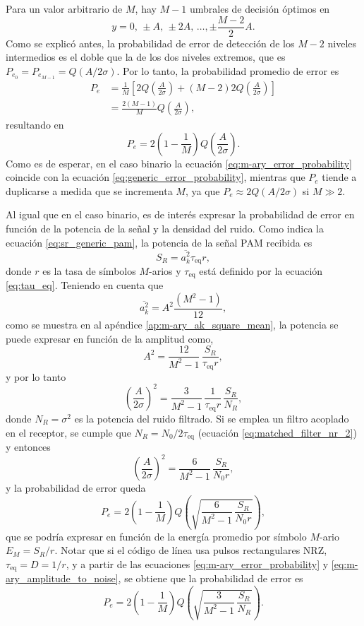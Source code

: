 \documentclass[a4paper]{article}
\begin{document}
Para un valor arbitrario de \(M\), hay \(M-1\) umbrales de decisión óptimos en 
\[
 y = 0,\,\pm A,\,\pm2A,\,\dots,\pm\frac{M-2}{2}A.
\]
Como se explicó antes, la probabilidad de error de detección de los \(M-2\) niveles intermedios es el doble que la de los dos niveles extremos, que es \(P_{e_0}=P_{e_{M-1}}=Q\left(A/2\sigma\right)\). Por lo tanto, la probabilidad promedio de error es
\begin{align*}
  P_e &= \frac{1}{M}\left[2Q\left(\frac{A}{2\sigma}\right)+(M-2)2Q\left(\frac{A}{2\sigma}\right)\right]\\
      &=\frac{2(M-1)}{M}Q\left(\frac{A}{2\sigma}\right),
\end{align*}
resultando en
\begin{equation}\label{eq:m-ary_error_probability}
  P_e=2\left(1-\frac{1}{M}\right)Q\left(\frac{A}{2\sigma}\right).
\end{equation}
Como es de esperar, en el caso binario la ecuación \ref{eq:m-ary_error_probability} coincide con la ecuación \ref{eq:generic_error_probability}, mientras que \(P_e\) tiende a duplicarse a medida que se incrementa \(M\), ya que \(P_e\approx 2Q\left(A/2\sigma\right)\) si \(M\gg 2\).

Al igual que en el caso binario, es de interés expresar la probabilidad de error en función de la potencia de la señal y la densidad del ruido. Como indica la ecuación \ref{eq:sr_generic_pam}, la potencia de la señal PAM recibida es
\[
 S_R=\overline{a_k^2}\tau_\textrm{eq}r,
\]
donde \(r\) es la tasa de símbolos \(M\)-arios y \(\tau_\textrm{eq}\) está definido por la ecuación \ref{eq:tau_eq}. Teniendo en cuenta que
\[
 \overline{a_k^2}=A^2\frac{(M^2-1)}{12},
\]
como se muestra en al apéndice \ref{ap:m-ary_ak_square_mean}, la potencia se puede expresar en función de la amplitud como,
\[
 A^2=\frac{12}{M^2-1}\,\frac{S_R}{\tau_\textrm{eq}r},
\]
y por lo tanto
\begin{equation}\label{eq:m-ary_amplitude_to_noise}
 \left(\frac{A}{2\sigma}\right)^2=\frac{3}{M^2-1}\,\frac{1}{\tau_\textrm{eq}r}\,\frac{S_R}{N_R},
\end{equation}
donde \(N_R=\sigma^2\) es la potencia del ruido filtrado. Si se emplea un filtro acoplado en el receptor, se cumple que \(N_{R}=N_0/2\tau_\textrm{eq}\) (ecuación \ref{eq:matched_filter_nr_2}) y entonces
\begin{equation}\label{eq:m-ary_amplitude_to_noise_rectangular}
 \left(\frac{A}{2\sigma}\right)^2=\frac{6}{M^2-1}\,\frac{S_R}{N_0r},
\end{equation}
y la probabilidad de error queda
\begin{equation}\label{eq:m-ary_error_probability_matched_filter}
 P_e=2\left(1-\frac{1}{M}\right)Q\left(\sqrt{\frac{6}{M^2-1}\,\frac{S_R}{N_0r}}\right),
\end{equation}
que se podría expresar en función de la energía promedio por símbolo \(M\)-ario \(E_M=S_R/r\).
Notar que si el código de línea usa pulsos rectangulares NRZ, \(\tau_\textrm{eq}=D=1/r\), y a partir de las ecuaciones \ref{eq:m-ary_error_probability} y \ref{eq:m-ary_amplitude_to_noise}, se obtiene que la probabilidad de error es
\[
 P_e=2\left(1-\frac{1}{M}\right)Q\left(\sqrt{\frac{3}{M^2-1}\,\frac{S_R}{N_R}}\right).
\]
\end{document}
